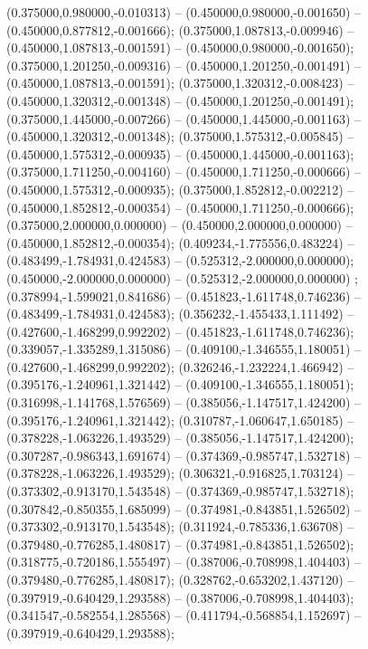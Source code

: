  (0.375000,0.980000,-0.010313) -- (0.450000,0.980000,-0.001650) -- (0.450000,0.877812,-0.001666);
 (0.375000,1.087813,-0.009946) -- (0.450000,1.087813,-0.001591) -- (0.450000,0.980000,-0.001650);
 (0.375000,1.201250,-0.009316) -- (0.450000,1.201250,-0.001491) -- (0.450000,1.087813,-0.001591);
 (0.375000,1.320312,-0.008423) -- (0.450000,1.320312,-0.001348) -- (0.450000,1.201250,-0.001491);
 (0.375000,1.445000,-0.007266) -- (0.450000,1.445000,-0.001163) -- (0.450000,1.320312,-0.001348);
 (0.375000,1.575312,-0.005845) -- (0.450000,1.575312,-0.000935) -- (0.450000,1.445000,-0.001163);
 (0.375000,1.711250,-0.004160) -- (0.450000,1.711250,-0.000666) -- (0.450000,1.575312,-0.000935);
 (0.375000,1.852812,-0.002212) -- (0.450000,1.852812,-0.000354) -- (0.450000,1.711250,-0.000666);
 (0.375000,2.000000,0.000000) -- (0.450000,2.000000,0.000000) -- (0.450000,1.852812,-0.000354);
 (0.409234,-1.775556,0.483224) -- (0.483499,-1.784931,0.424583) -- (0.525312,-2.000000,0.000000);
 (0.450000,-2.000000,0.000000) -- (0.525312,-2.000000,0.000000) ;
 (0.378994,-1.599021,0.841686) -- (0.451823,-1.611748,0.746236) -- (0.483499,-1.784931,0.424583);
 (0.356232,-1.455433,1.111492) -- (0.427600,-1.468299,0.992202) -- (0.451823,-1.611748,0.746236);
 (0.339057,-1.335289,1.315086) -- (0.409100,-1.346555,1.180051) -- (0.427600,-1.468299,0.992202);
 (0.326246,-1.232224,1.466942) -- (0.395176,-1.240961,1.321442) -- (0.409100,-1.346555,1.180051);
 (0.316998,-1.141768,1.576569) -- (0.385056,-1.147517,1.424200) -- (0.395176,-1.240961,1.321442);
 (0.310787,-1.060647,1.650185) -- (0.378228,-1.063226,1.493529) -- (0.385056,-1.147517,1.424200);
 (0.307287,-0.986343,1.691674) -- (0.374369,-0.985747,1.532718) -- (0.378228,-1.063226,1.493529);
 (0.306321,-0.916825,1.703124) -- (0.373302,-0.913170,1.543548) -- (0.374369,-0.985747,1.532718);
 (0.307842,-0.850355,1.685099) -- (0.374981,-0.843851,1.526502) -- (0.373302,-0.913170,1.543548);
 (0.311924,-0.785336,1.636708) -- (0.379480,-0.776285,1.480817) -- (0.374981,-0.843851,1.526502);
 (0.318775,-0.720186,1.555497) -- (0.387006,-0.708998,1.404403) -- (0.379480,-0.776285,1.480817);
 (0.328762,-0.653202,1.437120) -- (0.397919,-0.640429,1.293588) -- (0.387006,-0.708998,1.404403);
 (0.341547,-0.582554,1.285568) -- (0.411794,-0.568854,1.152697) -- (0.397919,-0.640429,1.293588);
